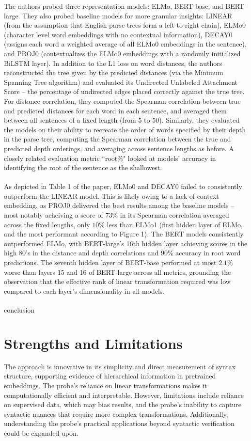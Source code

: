 \documentclass[11pt]{article}
\begin{document}
The authors probed three representation models: 
ELMo, BERT-base, and BERT-large. 
They also probed baseline 
models for more granular insights: LINEAR (from the assumption
that English parse trees form a left-to-right
chain), ELMo0 (character level word embeddings with no contextual information), 
DECAY0 (assigns each word a weighted average
of all ELMo0 embeddings in the sentence), 
and PROJ0 (contextualizes the ELMo0 embeddings
with a randomly initialized BiLSTM layer). 
In addition to the L1 loss on word distances, 
the authors reconstructed the tree given by
the predicted distances (via the Minimum Spanning Tree algorithm) and evaluated 
its Undirected Unlabeled Attachment Score – 
the percentage of undirected edges placed correctly
against the true tree. For distance correlation, 
they computed the Spearman correlation between 
true and predicted distances for each word in 
each sentence, and averaged them between 
all sentences of a fixed length (from 5 to 50).
Similarly, they evaluated the models 
on their ability to recreate the order of words 
specified by their depth in the parse tree,
computing the Spearman correlation between
the true and predicted depth orderings,
and averaging across sentence lengths as before. 
A closely related evaluation metric ``root\%"
looked at models’ accuracy in identifying the 
root of the sentence as the shallowest.
\\
\\
As depicted in Table 1 of the paper, 
ELMo0 and DECAY0 failed to consistently outperform 
the LINEAR model. This is likely owing to a lack of 
context embedding, as PROJ0 delivered 
the best results among the baseline models – 
most notably acheiving a score of $73\%$ in its Spearman
correlation averaged across the fixed lengths, only $10\%$ less
than ELMo1 (first hidden layer of ELMo, and the most performant according to Figure 1).
The BERT models consistently outperformed ELMo, with BERT-large's 16th hidden layer
achieving scores in the high 80's in the distance and depth correlations
and $90\%$ accuracy in root word predictions.
The seventh hidden layer of BERT-base
performed at most $2.1\%$ worse than layers 15 and 16 of BERT-large
across all metrics, grounding the observation that the 
effective rank of linear transformation required 
was low compared to each layer's dimensionality in all models. 
\\
\\
conclusion

\section*{Strengths and Limitations}
The approach is innovative in its simplicity and direct measurement of syntax structure, supporting evidence of hierarchical information in pretrained embeddings. The probe’s reliance on linear transformations makes it computationally efficient and interpretable. However, limitations include reliance on supervised data, which may bias results, and the probe's inability to capture syntactic nuances that require more complex transformations. Additionally, understanding the probe's practical applications beyond syntactic verification could be expanded upon.
\end{document}
